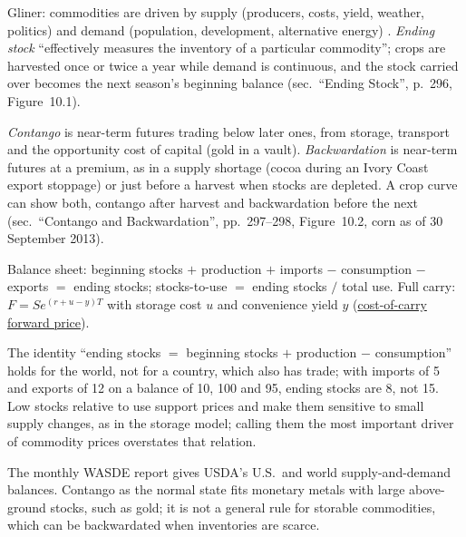 \begin{qfdefinition}\label{def:contango-backwardation-stocks}
 Gliner: commodities are driven by supply (producers, costs, yield, weather, politics) and demand (population, development, alternative energy) \citep[chap.~10, secs.\ ``Supply Drivers'' and ``Demand Drivers'', PDF pp.~293--296]{s7-gliner}. \emph{Ending stock} ``effectively measures the inventory of a particular commodity''; crops are harvested once or twice a year while demand is continuous, and the stock carried over becomes the next season's beginning balance (sec.\ ``Ending Stock'', p.~296, Figure~10.1).

\emph{Contango} is near-term futures trading below later ones, from storage, transport and the opportunity cost of capital (gold in a vault). \emph{Backwardation} is near-term futures at a premium, as in a supply shortage (cocoa during an Ivory Coast export stoppage) or just before a harvest when stocks are depleted. A crop curve can show both, contango after harvest and backwardation before the next (sec.\ ``Contango and Backwardation'', pp.~297--298, Figure~10.2, corn as of 30 September 2013).

 Balance sheet: beginning stocks $+$ production $+$ imports $-$ consumption $-$ exports $=$ ending stocks; stocks-to-use $=$ ending stocks $/$ total use. Full carry: $F=S e^{(r+u-y)T}$ with storage cost $u$ and convenience yield $y$ (\hyperref[res:cost-of-carry-forward-price]{cost-of-carry forward price}).

 The identity ``ending stocks $=$ beginning stocks $+$ production $-$ consumption'' holds for the world, not for a country, which also has trade; with imports of 5 and exports of 12 on a balance of 10, 100 and 95, ending stocks are 8, not 15. Low stocks relative to use support prices and make them sensitive to small supply changes, as in the storage model; calling them the most important driver of commodity prices overstates that relation.

 The monthly WASDE report \citep[catalogue entry]{physical-usda-wasde-2026} gives USDA's U.S.\ and world supply-and-demand balances. Contango as the normal state fits monetary metals with large above-ground stocks, such as gold; it is not a general rule for storable commodities, which can be backwardated when inventories are scarce.


\end{qfdefinition}
